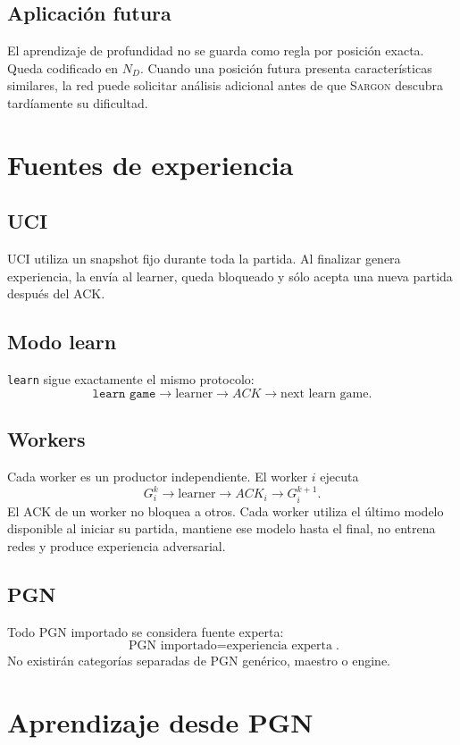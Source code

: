 \documentclass[11pt,a4paper]{article}
\newcommand{\Sargon}{\textsc{Sargon}}
\begin{document}
\subsection{Aplicación futura}
El aprendizaje de profundidad no se guarda como regla por posición exacta. Queda codificado en $N_D$. Cuando una posición futura presenta características similares, la red puede solicitar análisis adicional antes de que \Sargon{} descubra tardíamente su dificultad.

\section{Fuentes de experiencia}
\subsection{UCI}
UCI utiliza un snapshot fijo durante toda la partida. Al finalizar genera experiencia, la envía al learner, queda bloqueado y sólo acepta una nueva partida después del ACK.

\subsection{Modo learn}
\texttt{learn} sigue exactamente el mismo protocolo:
\[
\boxed{\texttt{learn game}\rightarrow\text{learner}\rightarrow ACK\rightarrow\text{next learn game}}.
\]

\subsection{Workers}
Cada worker es un productor independiente. El worker $i$ ejecuta
\[
G_i^k\rightarrow\text{learner}\rightarrow ACK_i\rightarrow G_i^{k+1}.
\]
El ACK de un worker no bloquea a otros. Cada worker utiliza el último modelo disponible al iniciar su partida, mantiene ese modelo hasta el final, no entrena redes y produce experiencia adversarial.

\subsection{PGN}
Todo PGN importado se considera fuente experta:
\[
\boxed{\text{PGN importado}=\text{experiencia experta}}.
\]
No existirán categorías separadas de PGN genérico, maestro o engine.

\section{Aprendizaje desde PGN}
\end{document}
